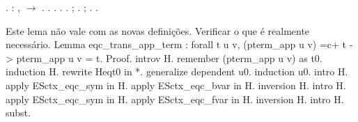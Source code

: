 \documentclass[12pt]{report}
\begin{document}
\begin{coqdoccode}
\coqdocnoindent
{}.\coqdoceol
\coqdocemptyline
\coqdocnoindent
{} : \coqdockw{\ensuremath{\forall}}  ,    \ensuremath{\rightarrow}   .\coqdoceol
\coqdocnoindent
{}.\coqdoceol
\coqdocindent{1.00em}
.  .  .\coqdoceol
\coqdocindent{1.00em}
 ; .\coqdoceol
\coqdocindent{1.00em}
   ; .\coqdoceol
\coqdocnoindent
{}.\coqdoceol
\coqdocemptyline
\end{coqdoccode}
Este lema não vale com as novas definições. Verificar o que é realmente necessário. 
Lemma eqc\_trans\_app\_term : forall t u v, (pterm\_app u v) =c+ t -> pterm\_app u v = t.
Proof. 
   introv H. remember (pterm\_app u v) as t0.
   induction H. rewrite Heqt0 in *.
   generalize dependent u0.
   induction u0. intro H.
   apply ESctx\_eqc\_sym in H.
   apply ESctx\_eqc\_bvar in H. inversion H.
   intro H. apply ESctx\_eqc\_sym in H.
   apply ESctx\_eqc\_fvar in H. inversion H.
   intro H. subst.
\end{document}
